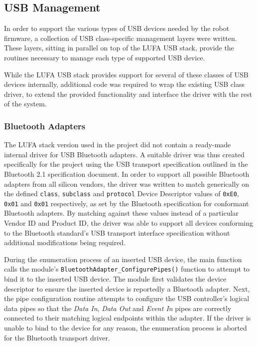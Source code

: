 \FloatBarrier
\subsection{USB Management}

In order to support the various types of USB devices needed by the robot firmware, a collection of USB class-specific management layers were written. These layers, sitting in parallel on top of the LUFA USB stack, provide the routines necessary to manage each type of supported USB device.

While the LUFA USB stack provides support for several of these classes of USB devices internally, additional code was required to wrap the existing USB class driver, to extend the provided functionality and interface the driver with the rest of the system.

\FloatBarrier
\subsubsection{Bluetooth Adapters}

The LUFA stack version used in the project did not contain a ready-made internal driver for USB Bluetooth adapters. A suitable driver was thus created specifically for the project using the USB transport specification outlined in the Bluetooth 2.1 specification document. In order to support all possible Bluetooth adapters from all silicon vendors, the driver was written to match generically on the defined \texttt{class}, \texttt{subclass} and \texttt{protocol} Device Descriptor values of \texttt{0xE0}, \texttt{0x01} and \texttt{0x01} respectively, as set by the Bluetooth specification for conformant Bluetooth adapters. By matching against these values instead of a particular Vendor ID and Product ID, the driver was able to support all devices conforming to the Bluetooth standard's USB transport interface specification without additional modifications being required.

During the enumeration process of an inserted USB device, the main function calls the module's \lstinline{BluetoothAdapter_ConfigurePipes()} function to attempt to bind it to the inserted USB device. The module first validates the device descriptor to ensure the inserted device is reportedly a Bluetooth adapter. Next, the pipe configuration routine attempts to configure the USB controller's logical data pipes so that the \textit{Data In}, \textit{Data Out} and \textit{Event In} pipes are correctly connected to their matching logical endpoints within the adapter. If the driver is unable to bind to the device for any reason, the enumeration process is aborted for the Bluetooth transport driver.

